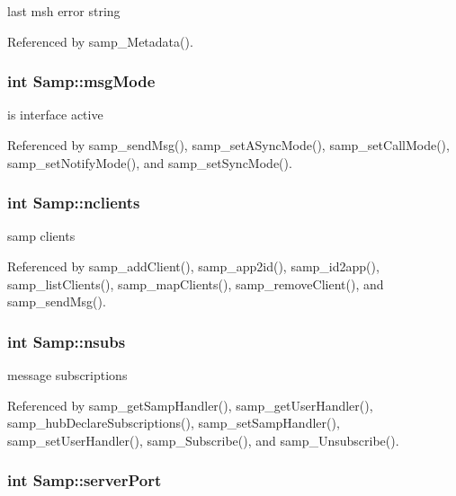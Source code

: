 last msh error string 

Referenced by samp\_\-Metadata().\hypertarget{structSamp_30ca22535582e7bf6416627d1cd46525}{
\subsubsection[{msgMode}]{\setlength{\rightskip}{0pt plus 5cm}int {\bf Samp::msgMode}}}
\label{structSamp_30ca22535582e7bf6416627d1cd46525}


is interface active 

Referenced by samp\_\-sendMsg(), samp\_\-setASyncMode(), samp\_\-setCallMode(), samp\_\-setNotifyMode(), and samp\_\-setSyncMode().\hypertarget{structSamp_97ef8ad57159f4b6c4fcd93a12853b69}{
\subsubsection[{nclients}]{\setlength{\rightskip}{0pt plus 5cm}int {\bf Samp::nclients}}}
\label{structSamp_97ef8ad57159f4b6c4fcd93a12853b69}


samp clients 

Referenced by samp\_\-addClient(), samp\_\-app2id(), samp\_\-id2app(), samp\_\-listClients(), samp\_\-mapClients(), samp\_\-removeClient(), and samp\_\-sendMsg().\hypertarget{structSamp_36f4cfae3407b8961e57a77abca7d599}{
\subsubsection[{nsubs}]{\setlength{\rightskip}{0pt plus 5cm}int {\bf Samp::nsubs}}}
\label{structSamp_36f4cfae3407b8961e57a77abca7d599}


message subscriptions 

Referenced by samp\_\-getSampHandler(), samp\_\-getUserHandler(), samp\_\-hubDeclareSubscriptions(), samp\_\-setSampHandler(), samp\_\-setUserHandler(), samp\_\-Subscribe(), and samp\_\-Unsubscribe().\hypertarget{structSamp_8849cb13cbedae805b4e35327bc449e2}{
\subsubsection[{serverPort}]{\setlength{\rightskip}{0pt plus 5cm}int {\bf Samp::serverPort}}}
\label{structSamp_8849cb13cbedae805b4e35327bc449e2}


